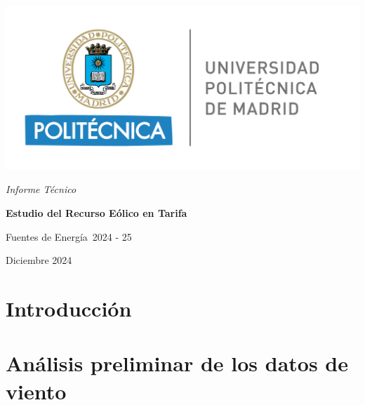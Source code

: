 \documentclass[12pt]{report}
\def\TituloProyecto{Estudio del Recurso Eólico en Tarifa}
\def\Asignatura{Fuentes de Energía}
\def\Curso{2024 - 25}
\def\Fecha{Diciembre 2024}
\begin{document}
\sloppy 
\setlength{\parindent}{30pt}
\setlength{\parskip}{6pt}
\renewcommand\thesection{\arabic{section}}
\renewcommand{\baselinestretch}{1.5}
\renewcommand{\listtablename}{Índice de tablas} %
\renewcommand{\tablename}{Tabla} %

\fancyhead{}
\fancyfoot{}
\pagestyle{fancy}
\chead[\rightmark]{\leftmark}

\fancyfoot[LE,RO]{\thepage}

\begin{titlepage}
    \centering
    \includegraphics[width=0.5\linewidth]{Imagenes/Logo UPM.png} \par
    \vspace{3 cm}
    {\itshape\huge Informe Técnico \par}
    \vspace{0.5cm}
    {\Huge \textbf{\TituloProyecto} \par}
    \vfill
    {\Large \Asignatura \  \Curso \par}
    \vspace{0.5cm}
    {\Large \Fecha \par}
\end{titlepage}

\tableofcontents
\pagebreak


\section{Introducción}

\section{Análisis preliminar de los datos de viento}
\end{document}

